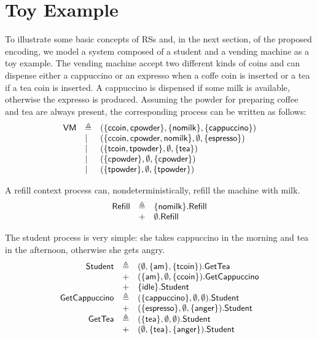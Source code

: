 
\section{Toy Example}\label{sec:student}

To illustrate some basic concepts of RSs and, in the next section, of the proposed encoding, we model a system composed of a student and a vending machine as a toy example.
The vending machine accept two different kinds of coins and can dispense either a cappuccino or an expresso when a coffe coin is inserted or a tea if a tea coin is inserted. A cappuccino is dispensed if some milk is available, otherwise the expresso is produced.
Assuming the powder for preparing coffee and tea are always present, the corresponding process can be written as follows:
\[
\begin{array}{lll}
\mathsf{VM} & \triangleq & (\{\mathsf{ccoin},\mathsf{cpowder}\},\{\mathsf{nomilk}\},\{\mathsf{cappuccino}\})\\
& | & (\{\mathsf{ccoin},\mathsf{cpowder},\mathsf{nomilk}\},\emptyset,\{\mathsf{espresso}\})\\
& | & (\{\mathsf{tcoin},\mathsf{tpowder}\},\emptyset,\{\mathsf{tea}\})\\
& | & (\{\mathsf{cpowder}\},\emptyset,\{\mathsf{cpowder}\})\\
& | & (\{\mathsf{tpowder}\},\emptyset,\{\mathsf{tpowder}\})\\
\end{array}
\]

A refill context process can, nondeterministically, refill the machine with milk.
\[
\begin{array}{lll}
\mathsf{Refill} & \triangleq & \{\mathsf{nomilk}\}.\mathsf{Refill}\\
& + & \emptyset.\mathsf{Refill}\\
\end{array}
\]

The student process is very simple: she takes cappuccino in the morning and tea in the afternoon, otherwise she gets angry.
\[
\begin{array}{rll}
\mathsf{Student} & \triangleq & (\emptyset,\{\mathsf{am}\},\{\mathsf{tcoin}\}).\mathsf{GetTea}\\
& + & (\{\mathsf{am}\},\emptyset,\{\mathsf{ccoin}\}).\mathsf{GetCappuccino}\\
& + & \{\mathsf{idle}\}.\mathsf{Student}\\
\mathsf{GetCappuccino} & \triangleq & (\{\mathsf{cappuccino}\},\emptyset,\emptyset).\mathsf{Student}\\
& + & (\{\mathsf{espresso}\},\emptyset,\{\mathsf{anger}\}).\mathsf{Student}\\
\mathsf{GetTea} & \triangleq & (\{\mathsf{tea}\},\emptyset,\emptyset).\mathsf{Student}\\
& + & (\emptyset,\{\mathsf{tea}\},\{\mathsf{anger}\}).\mathsf{Student}\\
\end{array}
\]

